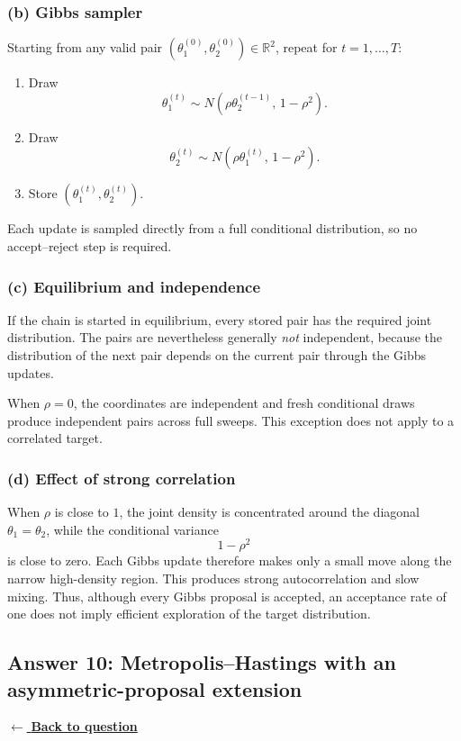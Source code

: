 \documentclass[11pt,a4paper]{article}
\newcommand{\answernav}[1]{%
  \label{answer:#1}%
  \noindent\hyperref[question:#1]{$\leftarrow$ \textbf{Back to question}}%
  \par\smallskip}
\begin{document}
\subsubsection*{(b) Gibbs sampler}

Starting from any valid pair
\((\theta_1^{(0)},\theta_2^{(0)})\in\mathbb{R}^2\), repeat for
\(t=1,\ldots,T\):
\begin{enumerate}
    \item Draw
    \[
    \theta_1^{(t)}
    \sim N\left(\rho\theta_2^{(t-1)},\,1-\rho^2\right).
    \]
    \item Draw
    \[
    \theta_2^{(t)}
    \sim N\left(\rho\theta_1^{(t)},\,1-\rho^2\right).
    \]
    \item Store \((\theta_1^{(t)},\theta_2^{(t)})\).
\end{enumerate}

Each update is sampled directly from a full conditional distribution, so no
accept--reject step is required.

\subsubsection*{(c) Equilibrium and independence}

If the chain is started in equilibrium, every stored pair has the required
joint distribution. The pairs are nevertheless generally \emph{not}
independent, because the distribution of the next pair depends on the current
pair through the Gibbs updates.

When $\rho=0$, the coordinates are independent and fresh conditional draws produce independent pairs across full sweeps. This exception does not apply to a correlated target.

\subsubsection*{(d) Effect of strong correlation}

When \(\rho\) is close to \(1\), the joint density is concentrated around the
diagonal \(\theta_1=\theta_2\), while the conditional variance
\[
1-\rho^2
\]
is close to zero. Each Gibbs update therefore makes only a small move along
the narrow high-density region. This produces strong autocorrelation and slow
mixing. Thus, although every Gibbs proposal is accepted, an acceptance rate of
one does not imply efficient exploration of the target distribution.

\clearpage

\subsection{Answer 10: Metropolis--Hastings with an asymmetric-proposal extension}
\answernav{10}
\end{document}
